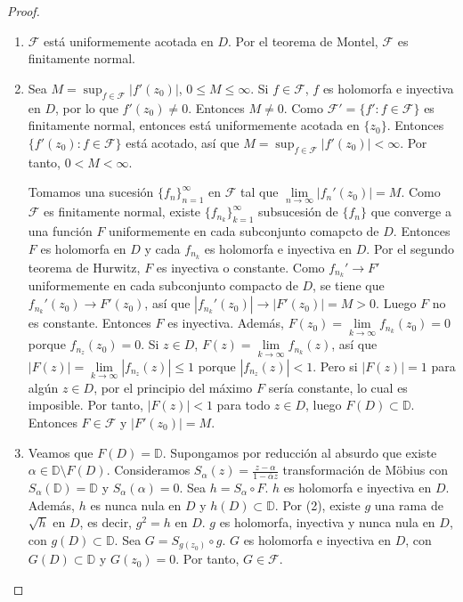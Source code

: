 \begin{proof}
\begin{enumerate}
        \item $\mathcal{F}$ está uniformemente acotada en $D$.
              Por el teorema de Montel, $\mathcal{F}$ es finitamente normal.

        \item Sea $M = \sup_{f \in \mathcal{F}} |f'(z_0)|$, $0 \leq M \leq \infty$.
              Si $f \in \mathcal{F}$, $f$ es holomorfa e inyectiva en $D$, por lo que $f'(z_0) \neq 0$.
              Entonces $M \neq 0$.
              Como $\mathcal{F}' = \{f' : f \in \mathcal{F}\}$ es finitamente normal, entonces está uniformemente acotada en $\{z_0\}$.
              Entonces $\{f'(z_0) : f \in \mathcal{F}\}$ está acotado, así que $M = \sup_{f \in \mathcal{F}} |f'(z_0)| < \infty$.
              Por tanto, $0 < M < \infty$.

              Tomamos una sucesión $\{f_n\}_{n=1}^\infty$ en $\mathcal{F}$ tal que $\lim\limits_{n \to \infty} |f_n'(z_0)| = M$.
              Como $\mathcal{F}$ es finitamente normal, existe $\{f_{n_k}\}_{k=1}^\infty$ subsucesión de $\{f_n\}$ que converge a una función $F$ uniformemente en cada subconjunto comapcto de $D$.
              Entonces $F$ es holomorfa en $D$ y cada $f_{n_k}$ es holomorfa e inyectiva en $D$.
              Por el segundo teorema de Hurwitz, $F$ es inyectiva o constante.
              Como $f_{n_k}' \to F'$ uniformemente en cada subconjunto compacto de $D$, se tiene que $f_{n_k}'(z_0) \to F'(z_0)$, así que $|f_{n_k}'(z_0)| \to |F'(z_0)| = M > 0$.
              Luego $F$ no es constante.
              Entonces $F$ es inyectiva.
              Además, $F(z_0)= \lim\limits_{k \to \infty} f_{n_k}(z_0) = 0$ porque $f_{n_z}(z_0) = 0$.
              Si $z \in D$, $F(z) = \lim\limits_{k \to \infty} f_{n_k}(z)$, así que $|F(z)| = \lim\limits_{k \to \infty} |f_{n_z}(z)| \leq 1$ porque $|f_{n_z}(z)| < 1$.
              Pero si $|F(z)| = 1$ para algún $z \in D$, por el principio del máximo $F$ sería constante, lo cual es imposible.
              Por tanto, $|F(z)| < 1$ para todo $z \in D$, luego $F(D) \subset \mathbb{D}$.
              Entonces $F \in \mathcal{F}$ y $|F'(z_0)| = M$.

        \item Veamos que $F(D) = \mathbb{D}$.
              Supongamos por reducción al absurdo que existe $\alpha \in \mathbb{D} \setminus F(D)$.
              Consideramos $S_\alpha(z) = \frac{z-\alpha}{1-\overline{\alpha}z}$ transformación de Möbius con $S_\alpha(\mathbb{D}) = \mathbb{D}$ y $S_\alpha(\alpha) = 0$.
              Sea $h = S_\alpha \circ F$.
              $h$ es holomorfa e inyectiva en $D$.
              Además, $h$ es nunca nula en $D$ y $h(D) \subset \mathbb{D}$.
              Por (2), existe $g$ una rama de $\sqrt{h}$ en $D$, es decir, $g^2 = h$ en $D$.
              $g$ es holomorfa, inyectiva y nunca nula en $D$, con $g(D) \subset \mathbb{D}$.
              Sea $G = S_{g(z_0)} \circ g$.
              $G$ es holomorfa e inyectiva en $D$, con $G(D) \subset \mathbb{D}$ y $G(z_0) = 0$.
              Por tanto, $G \in \mathcal{F}$.


\end{enumerate}
\end{proof}
